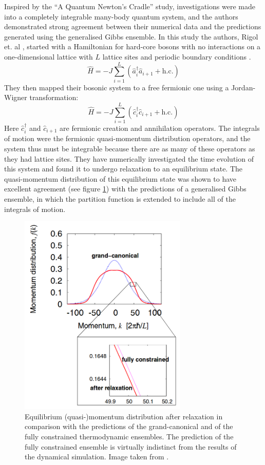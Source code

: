 \documentclass[a4paper, 10pt]{article}
\theoremstyle{plain}
\begin{document}
Inspired by the ``A Quantum Newton's Cradle'' study, investigations were made
into a completely integrable many-body quantum system, and the authors 
demonstrated strong agreement between their numerical data and the 
predictions generated using the generalised Gibbs ensemble. 
In this study the authors, Rigol et.
al \cite{Rigol2007}, started with a Hamiltonian for hard-core bosons with no
interactions on a one-dimensional lattice with $L$ lattice sites and 
periodic boundary conditions .
\begin{equation}
 \hat{H}=-J\sum_{i=1}^{L} (\hat{a}_{i}^{\dagger}\hat{a}_{i+1} + \text{h.c.})
\end{equation}
They then mapped their bosonic system to a free fermionic one using a
Jordan-Wigner transformation:
\begin{equation}
    \hat{H}
    =
    -J \sum_{i=1}^{L}{(\hat{c}_{i}^{\dagger}\hat{c}_{i+1} + \text{h.c.})}
\end{equation}
Here $\hat{c}_{i}^{\dagger}$ and $\hat{c}_{i+1}$ are fermionic creation and
annihilation operators. The integrals of motion were the fermionic
quasi-momentum distribution operators, and the system thus must be
integrable because there are as many of these operators as they had lattice
sites. They have numerically investigated the time evolution of this system and
found it to undergo relaxation to an equilibrium state. The quasi-momentum 
distribution of this equilibrium state was shown to have excellent
agreement (see figure \ref{fig:GGEquasimomentum}) with the predictions of a 
generalised Gibbs ensemble, in which the partition function is extended to 
include all of the integrals of motion.
\begin{figure}[H]
    \begin{center}
        \includegraphics[width=8cm]{grand_canonical_vs_GGE}
    \end{center}
    \caption{\label{fig:GGEquasimomentum}Equilibrium (quasi-)momentum distribution after relaxation in
             comparison with the predictions of the grand-canonical and of the
             fully constrained thermodynamic ensembles. The prediction of the
             fully constrained  ensemble is virtually indistinct from the
             results of the dynamical simulation. Image taken from
             \cite{Rigol2007}.}
\end{figure}
\end{document}
